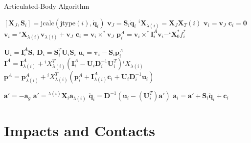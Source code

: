 \clearpage
\begin{algorithm}[h]
    \caption{Articulated-Body Algorithm}
    \label{alg:aba}
    \begin{algorithmic}[1]
        \STATE $[\mathbf{X}_J, \mathbf{S}_i] = \text{jcalc}(\text{jtype}(i), \dot{\mathbf{q}}_i)$
        \STATE $\mathrm{\mathbf{v}}_J = \mathbf{S}_i \dot{\mathbf{q}}_i$
        \STATE $^i\mathbf{X}_{\lambda(i)} = \mathbf{X}_J\mathbf{X}_T (i)$
        \STATE $\mathrm{\mathbf{v}}_i = \mathrm{\mathbf{v}}_J$
        \STATE $\mathbf{c}_i = \mathbf{0}$
        \ELSE
        \STATE $\mathrm{\mathbf{v}}_i = {}^i\mathbf{X} _{\lambda(i)}\mathrm{\mathbf{v}}_{\lambda(i)} + \mathrm{\mathbf{v}}_J$
        \STATE $\mathbf{c}_i = \mathrm{\mathbf{v}}_i \times ^* \mathrm{\mathbf{v}}_J$
        \ENDIF
        \STATE $\mathbf{p}_i ^A = \mathrm{\mathbf{v}}_i \times^* \mathbf{I}_i ^A \mathrm{\mathbf{v}}_i - ^i\mathbf{X} _0 ^* f ^* _i $
        \ENDFOR

        \STATE $\mathbf{U}_i = \mathbf{I}_i ^A \mathbf{S}_i$
        \STATE $\mathbf{D} _i = \mathbf{S} ^T _i  {} \mathbf{U} _i \mathbf{S} _i $
        \STATE $\mathbf{u}_i = \boldsymbol{\tau}_i - \mathbf{S}_i\mathbf{p}_i^A$
        \STATE $\mathbf{I} ^A = \mathbf{I} ^A _{\lambda (i)} + {} ^i X _{\lambda (i)} ^T (\mathbf{I} _i ^A - {}  \mathbf{U} _i  \mathbf{D} ^{-1} _i  {}  \mathbf{U} ^T _i) {} ^i X _{\lambda (i)} $
        \STATE $\mathbf{p} ^A = \mathbf{p} ^A _{\lambda (i)} + {} ^i X _{\lambda (i)} ^T (\mathbf{p} ^A_i + \mathbf{I} ^A _{\lambda (i)}  \mathbf{c}_i + {}  \mathbf{U} _i \mathbf{D} ^{-1} _i {} \mathbf{u} _i) $
        \ENDIF
        \ENDFOR

        \STATE $\mathbf{a}' = -\mathbf{a}_g$
        \ELSE
        \STATE $\mathbf{a}' = {}^{\lambda(i)}\mathbf{X}_i \mathbf{a}_{\lambda(i)}$
        \STATE $\ddot{\mathbf{q}}_i = \mathbf{D}^{-1} (\mathbf{u}_i - (\mathbf{U}_i^T)\mathbf{a}')$
        \STATE $\mathbf{a}_i = \mathbf{a}' + \mathbf{S}_i\mathbf{\ddot{q}}_i + \mathbf{c} _i$
        \ENDIF
        \ENDFOR
    \end{algorithmic}
\end{algorithm}

\section{Impacts and Contacts}
\label{sec:back_contacts}
